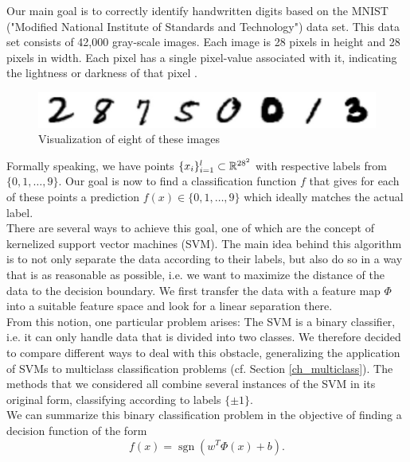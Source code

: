 Our main goal is to correctly identify handwritten digits based on the MNIST  ("Modified National Institute of Standards and Technology") data set.
This data set consists of 42,000 gray-scale images. Each image is 28 pixels in height and 28 pixels in width. Each pixel has a single pixel-value associated with it, indicating the lightness or darkness of that pixel \cite{kaggel}.

\begin{figure}[h]
	\includegraphics[width=1\textwidth, center]{Digits2}
	\caption{Visualization of eight of these images}
\end{figure}


Formally speaking, we have points  $\{x_i\}_{i=1}^l \subset \mathbb{R}^{28^2}$ with respective labels from $\{0,1,\ldots, 9\}$. Our goal is now to find a classification function $f$ that gives for each of these points a prediction $f(x) \in \{0,1,\ldots, 9\}$ which ideally matches the actual label.\\

There are several ways to achieve this goal, one of which are the concept of {kernelized} support vector machines (SVM). The main idea behind this algorithm is to not only separate the data according to their labels, but also do so in a way that is as reasonable as possible, i.e. we want to maximize the distance of the data to the decision boundary. We first transfer the data with a feature map $\Phi$ into a suitable feature space and look for a linear separation there.\\

From this notion, one particular problem arises: The SVM is a binary classifier, i.e. it can only handle data that is divided into two classes. We therefore decided to compare different ways to deal with this obstacle, generalizing the application of SVMs to multiclass  classification problems (cf. Section \ref{ch_multiclass}). The methods that we considered all combine several instances of the SVM in its original form, classifying according to labels $\{\pm 1\}$.\\

We can summarize this binary classification problem in the objective of finding a decision function of the form
\begin{equation*}
f(x) = \operatorname{sgn}\left(w^T\Phi(x) + b\right).
\end{equation*}


